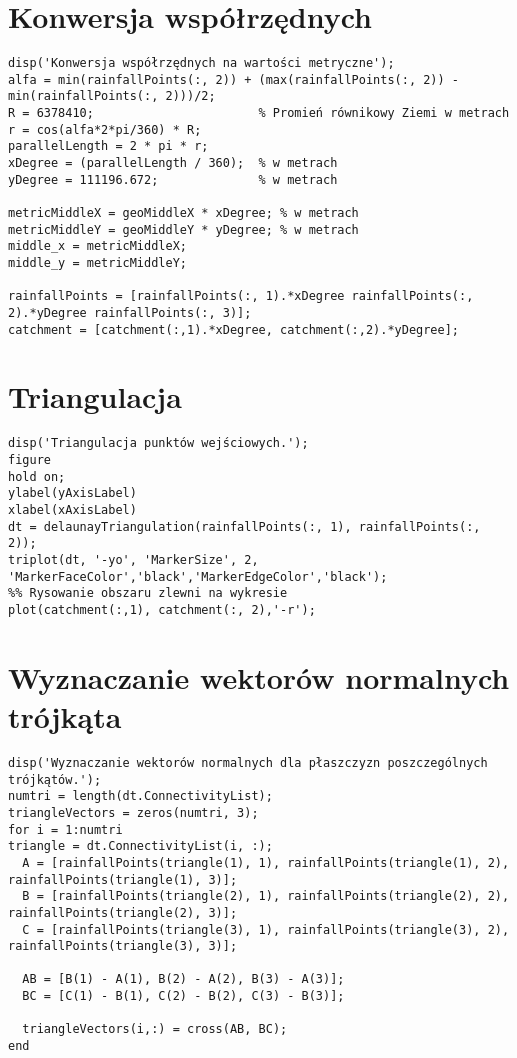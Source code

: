 \section{Konwersja współrzędnych}
\begin{lstlisting}
disp('Konwersja współrzędnych na wartości metryczne');
alfa = min(rainfallPoints(:, 2)) + (max(rainfallPoints(:, 2)) - min(rainfallPoints(:, 2)))/2;
R = 6378410;                       % Promień równikowy Ziemi w metrach
r = cos(alfa*2*pi/360) * R;
parallelLength = 2 * pi * r;
xDegree = (parallelLength / 360);  % w metrach
yDegree = 111196.672;              % w metrach

metricMiddleX = geoMiddleX * xDegree; % w metrach
metricMiddleY = geoMiddleY * yDegree; % w metrach
middle_x = metricMiddleX;
middle_y = metricMiddleY;

rainfallPoints = [rainfallPoints(:, 1).*xDegree rainfallPoints(:, 2).*yDegree rainfallPoints(:, 3)];
catchment = [catchment(:,1).*xDegree, catchment(:,2).*yDegree];
\end{lstlisting}


\section{Triangulacja}
\begin{lstlisting}
disp('Triangulacja punktów wejściowych.');
figure
hold on;
ylabel(yAxisLabel)
xlabel(xAxisLabel)
dt = delaunayTriangulation(rainfallPoints(:, 1), rainfallPoints(:, 2));
triplot(dt, '-yo', 'MarkerSize', 2, 'MarkerFaceColor','black','MarkerEdgeColor','black');
%% Rysowanie obszaru zlewni na wykresie
plot(catchment(:,1), catchment(:, 2),'-r');
\end{lstlisting}




\section{Wyznaczanie wektorów normalnych trójkąta}
\begin{lstlisting}
disp('Wyznaczanie wektorów normalnych dla płaszczyzn poszczególnych trójkątów.');
numtri = length(dt.ConnectivityList);
triangleVectors = zeros(numtri, 3);
for i = 1:numtri
triangle = dt.ConnectivityList(i, :);
  A = [rainfallPoints(triangle(1), 1), rainfallPoints(triangle(1), 2), rainfallPoints(triangle(1), 3)];
  B = [rainfallPoints(triangle(2), 1), rainfallPoints(triangle(2), 2), rainfallPoints(triangle(2), 3)];
  C = [rainfallPoints(triangle(3), 1), rainfallPoints(triangle(3), 2), rainfallPoints(triangle(3), 3)];

  AB = [B(1) - A(1), B(2) - A(2), B(3) - A(3)];
  BC = [C(1) - B(1), C(2) - B(2), C(3) - B(3)];
    
  triangleVectors(i,:) = cross(AB, BC);
end
\end{lstlisting}




